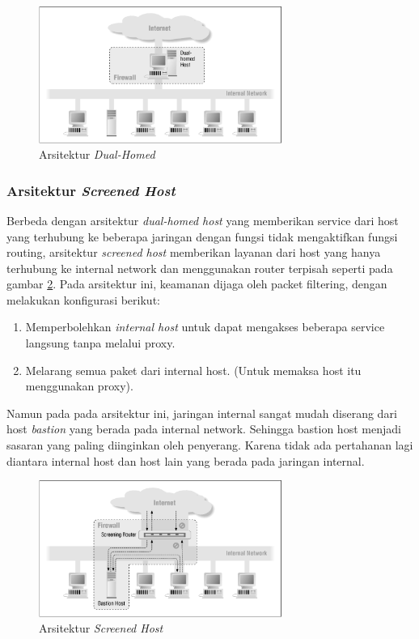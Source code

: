 \begin{figure}[H]
	\centering
	\includegraphics[width=300px]{resources/dual_homed.png}
	\caption{Arsitektur \textit{Dual-Homed}}
	\label{fig:dual_homed}
\end{figure}

\subsubsection{Arsitektur \textit{Screened Host}}

Berbeda dengan arsitektur \textit{dual-homed host} yang memberikan service dari host yang terhubung ke beberapa jaringan dengan fungsi tidak mengaktifkan fungsi routing, arsitektur \textit{screened host} memberikan layanan dari host yang hanya terhubung ke internal network dan menggunakan router terpisah seperti pada  gambar \ref{fig:screened_host}. Pada arsitektur ini, keamanan dijaga oleh packet filtering, dengan melakukan konfigurasi berikut:

\begin{enumerate}
\item Memperbolehkan \textit{internal host} untuk dapat mengakses beberapa service langsung tanpa melalui proxy.
\item Melarang semua paket dari internal host. (Untuk memaksa host itu menggunakan proxy).
\end{enumerate}

Namun pada pada arsitektur ini, jaringan internal sangat mudah diserang dari host \textit{bastion} yang berada pada internal network. Sehingga bastion host menjadi sasaran yang paling diinginkan oleh penyerang. Karena tidak ada pertahanan lagi diantara internal host dan host lain yang berada pada jaringan internal.

\begin{figure}[H]
	\centering
	\includegraphics[width=300px]{resources/screened_host.png}
	\caption{Arsitektur \textit{Screened Host}}
	\label{fig:screened_host}
\end{figure}


